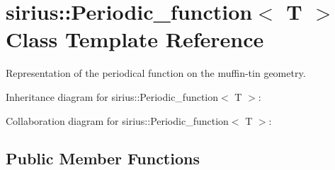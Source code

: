 \hypertarget{classsirius_1_1_periodic__function}{}\section{sirius\+:\+:Periodic\+\_\+function$<$ T $>$ Class Template Reference}
\label{classsirius_1_1_periodic__function}


Representation of the periodical function on the muffin-\/tin geometry.  




Inheritance diagram for sirius\+:\+:Periodic\+\_\+function$<$ T $>$\+:


Collaboration diagram for sirius\+:\+:Periodic\+\_\+function$<$ T $>$\+:
\subsection*{Public Member Functions}
